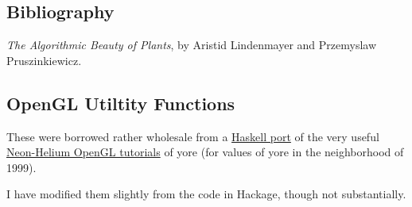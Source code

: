 \documentclass[]{article}
\begin{document}
\subsection{Bibliography}

\emph{The Algorithmic Beauty of Plants}, by Aristid Lindenmayer and
Przemyslaw Pruszinkiewicz.

\subsection{OpenGL Utiltity Functions}

These were borrowed rather wholesale from a
\href{http://hackage.haskell.org/package/nehe-tuts}{Haskell port} of the
very useful \href{http://nehe.gamedev.net/}{Neon-Helium OpenGL
tutorials} of yore (for values of yore in the neighborhood of 1999).

I have modified them slightly from the code in Hackage, though not
substantially.
\end{document}
